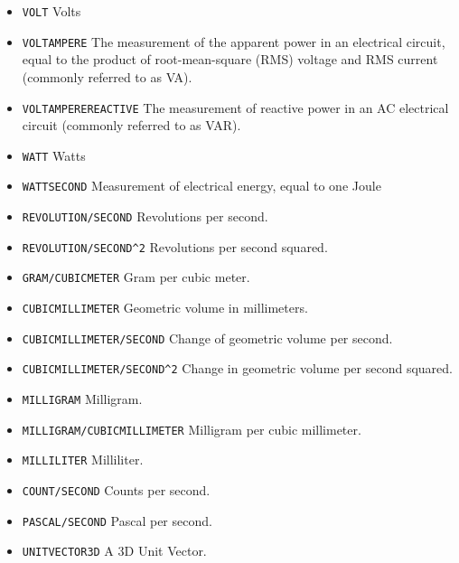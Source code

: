 \begin{itemize}
\begin{itemize}
\item \texttt{VOLT} \newline Volts 
\item \texttt{VOLT\textunderscore AMPERE} \newline The measurement of the apparent power in an electrical circuit, equal to the product of root-mean-square (RMS) voltage and RMS current (commonly referred to as VA). 
\item \texttt{VOLT\textunderscore AMPERE\textunderscore REACTIVE} \newline The measurement of reactive power in an AC electrical circuit (commonly referred to as VAR). 
\item \texttt{WATT} \newline Watts 
\item \texttt{WATT\textunderscore SECOND} \newline Measurement of electrical energy, equal to one Joule 
\item \texttt{REVOLUTION/SECOND} \newline Revolutions per second. 
\item \texttt{REVOLUTION/SECOND\^{}2} \newline Revolutions per second squared. 
\item \texttt{GRAM/CUBIC\textunderscore METER} \newline Gram per cubic meter. 
\item \texttt{CUBIC\textunderscore MILLIMETER} \newline Geometric volume in millimeters. 
\item \texttt{CUBIC\textunderscore MILLIMETER/SECOND} \newline Change of geometric volume per second. 
\item \texttt{CUBIC\textunderscore MILLIMETER/SECOND\^{}2} \newline Change in geometric volume per second squared. 
\item \texttt{MILLIGRAM} \newline Milligram. 
\item \texttt{MILLIGRAM/CUBIC\textunderscore MILLIMETER} \newline Milligram per cubic millimeter. 
\item \texttt{MILLILITER} \newline Milliliter. 
\item \texttt{COUNT/SECOND} \newline Counts per second. 
\item \texttt{PASCAL/SECOND} \newline Pascal per second. 
\item \texttt{UNIT\textunderscore VECTOR\textunderscore 3D} \newline A 3D Unit Vector.


\end{itemize}
\end{itemize}
